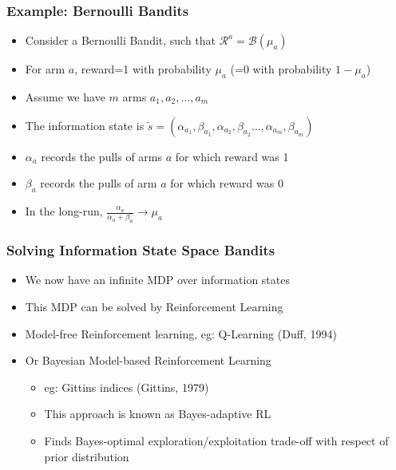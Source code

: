 \documentclass[handout]{beamer}
\begin{document}
\begin{frame}
\frametitle{Example: Bernoulli Bandits}
\pause
\begin{itemize}[<+->]
\item Consider a Bernoulli Bandit, such that $\mathcal{R}^a = \mathcal{B}(\mu_a)$
\item For arm $a$, reward=1 with probability $\mu_a$ (=0 with probability $1-\mu_a$)
\item Assume we have $m$ arms $a_1, a_2, \ldots, a_m$
\item The information state is $\tilde{s} = (\alpha_{a_1}, \beta_{a_1}, \alpha_{a_2}, \beta_{a_2}\ldots, \alpha_{a_m}, \beta_{a_m})$
\item $\alpha_a$ records the pulls of arms $a$  for which reward was 1
\item $\beta_a$ records the pulls of arm $a$ for which reward was 0
\item In the long-run, $\frac {\alpha_a} {\alpha_a + \beta_a} \rightarrow \mu_a$
\end{itemize}
\end{frame}

\begin{frame}
\frametitle{Solving Information State Space Bandits}
\pause
\begin{itemize}[<+->]
\item We now have an infinite MDP over information states
\item This MDP can be solved by Reinforcement Learning
\item Model-free Reinforcement learning, eg: Q-Learning (Duff, 1994)
\item Or Bayesian Model-based Reinforcement Learning
\begin{itemize}
\item eg: Gittins indices (Gittins, 1979)
\item This approach is known as Bayes-adaptive RL
\item Finds Bayes-optimal exploration/exploitation trade-off with respect of prior distribution
\end{itemize}
\end{itemize}
\end{frame}
\end{document}
